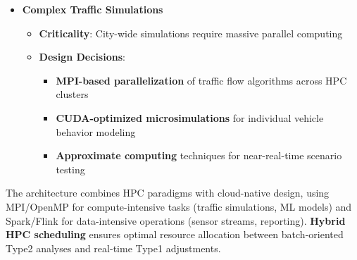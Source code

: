 \documentclass[11.5pt]{article}
\begin{document}
\begin{itemize}
        \item \textbf{Complex Traffic Simulations}
        \begin{itemize}
            \item \textbf{Criticality}: City-wide simulations require massive parallel computing
            \item \textbf{Design Decisions}:
            \begin{itemize}
                \item \textbf{MPI-based parallelization} of traffic flow algorithms across HPC clusters
                \item \textbf{CUDA-optimized microsimulations} for individual vehicle behavior modeling
                \item \textbf{Approximate computing} techniques for near-real-time scenario testing
            \end{itemize}
        \end{itemize}
    \end{itemize}
    
    The architecture combines HPC paradigms with cloud-native design, using MPI/OpenMP for compute-intensive tasks (traffic simulations, ML models) and Spark/Flink for data-intensive operations (sensor streams, reporting). \textbf{Hybrid HPC scheduling} ensures optimal resource allocation between batch-oriented Type2 analyses and real-time Type1 adjustments.
    
    \clearpage
    \printbibliography
    [heading=bibintoc, title = {References}]
\end{document}
